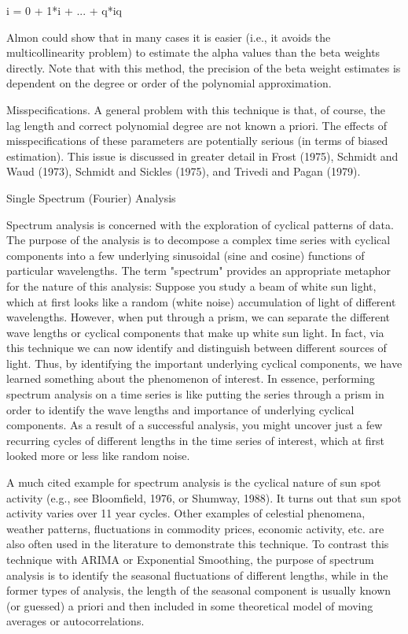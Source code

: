 i = 0 + 1*i + ... + q*iq

Almon could show that in many cases it is easier (i.e., it avoids the multicollinearity problem) to estimate the alpha values than the beta weights directly. Note that with this method, the precision of the beta weight estimates is dependent on the degree or order of the polynomial approximation.

Misspecifications. A general problem with this technique is that, of course, the lag length and correct polynomial degree are not known a priori. The effects of misspecifications of these parameters are potentially serious (in terms of biased estimation). This issue is discussed in greater detail in Frost (1975), Schmidt and Waud (1973), Schmidt and Sickles (1975), and Trivedi and Pagan (1979).


Single Spectrum (Fourier) Analysis

Spectrum analysis is concerned with the exploration of cyclical patterns of data. The purpose of the analysis is to decompose a complex time series with cyclical components into a few underlying sinusoidal (sine and cosine) functions of particular wavelengths. The term "spectrum" provides an appropriate metaphor for the nature of this analysis: Suppose you study a beam of white sun light, which at first looks like a random (white noise) accumulation of light of different wavelengths. However, when put through a prism, we can separate the different wave lengths or cyclical components that make up white sun light. In fact, via this technique we can now identify and distinguish between different sources of light. Thus, by identifying the important underlying cyclical components, we have learned something about the phenomenon of interest. In essence, performing spectrum analysis on a time series is like putting the series through a prism in order to identify the wave lengths and importance of underlying cyclical components. As a result of a successful analysis, you might uncover just a few recurring cycles of different lengths in the time series of interest, which at first looked more or less like random noise.

A much cited example for spectrum analysis is the cyclical nature of sun spot activity (e.g., see Bloomfield, 1976, or Shumway, 1988). It turns out that sun spot activity varies over 11 year cycles. Other examples of celestial phenomena, weather patterns, fluctuations in commodity prices, economic activity, etc. are also often used in the literature to demonstrate this technique. To contrast this technique with ARIMA or Exponential Smoothing, the purpose of spectrum analysis is to identify the seasonal fluctuations of different lengths, while in the former types of analysis, the length of the seasonal component is usually known (or guessed) a priori and then included in some theoretical model of moving averages or autocorrelations.

